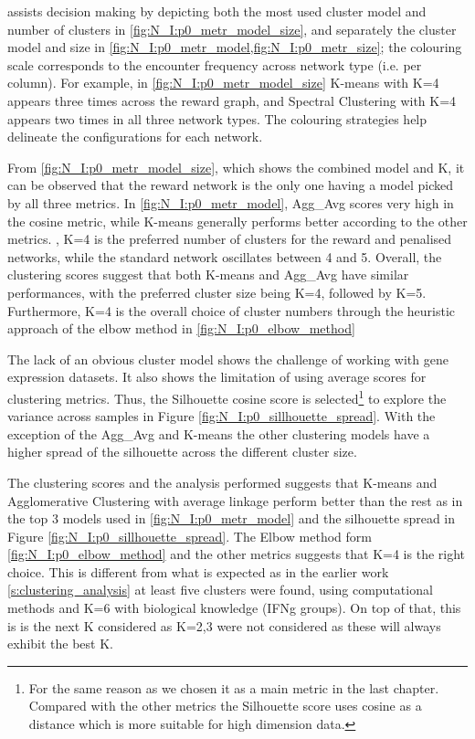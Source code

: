  assists decision making by depicting both the most used cluster model and number of clusters in \cref{fig:N_I:p0_metr_model_size}, and separately the cluster model and size in \cref{fig:N_I:p0_metr_model,fig:N_I:p0_metr_size}; the colouring scale corresponds to the encounter frequency across network type (i.e. per column). For example, in \cref{fig:N_I:p0_metr_model_size} K-means with K=4 appears three times across the reward graph, and Spectral Clustering with K=4 appears two times in all three network types. The colouring strategies help delineate the configurations for each network.

From \cref{fig:N_I:p0_metr_model_size}, which shows the combined model and K, it can be observed that the reward network is the only one having a model picked by all three metrics. In \cref{fig:N_I:p0_metr_model}, Agg\_Avg scores very high in the cosine metric, while K-means generally performs better according to the other metrics. , K=4 is the preferred number of clusters for the reward and penalised networks, while the standard network oscillates between 4 and 5. Overall, the clustering scores suggest that both K-means and Agg\_Avg have similar performances, with the preferred cluster size being K=4, followed by K=5. Furthermore, K=4 is the overall choice of cluster numbers through the heuristic approach of the elbow method in \cref{fig:N_I:p0_elbow_method} 


The lack of an obvious cluster model shows the challenge of working with gene expression datasets. It also shows the limitation of using average scores for clustering metrics. Thus, the Silhouette cosine score is selected\footnote{For the same reason as we chosen it as a main metric in the last chapter. Compared with the other metrics the Silhouette score uses cosine as a distance which is more suitable for high dimension data.} to explore the variance across samples in Figure \cref{fig:N_I:p0_sillhouette_spread}. With the exception of the Agg\_Avg and K-means the other clustering models have a higher spread of the silhouette across the different cluster size.

The clustering scores and the analysis performed suggests that K-means and Agglomerative Clustering with average linkage perform better than the rest as in the top 3 models used in \cref{fig:N_I:p0_metr_model} and the silhouette spread in Figure \cref{fig:N_I:p0_sillhouette_spread}. The Elbow method form \cref{fig:N_I:p0_elbow_method} and the other metrics suggests that K=4 is the right choice. This is different from what is expected as in the earlier work \cref{s:clustering_analysis} at least five clusters were found, using computational methods and K=6 with biological knowledge (IFNg groups). On top of that, this is is the next K considered as K=2,3 were not considered as these will always exhibit the best K.

